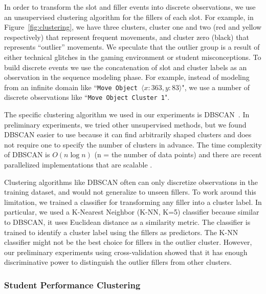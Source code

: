 \documentclass{sigchi}
\begin{document}
	In order to transform the slot and filler events into discrete observations, we use an unsupervised clustering algorithm for the fillers of each slot.
	For example, in Figure~\ref{fig:clustering}, we have three clusters, cluster one and two (red and yellow respectively) that represent frequent movements, and cluster zero (black) that represents ``outlier'' movements.
	We speculate that the outlier group is a result of either technical glitches in the gaming environment or student misconceptions.
	To build discrete events we use the concatenation of slot and cluster labels as an observation in the sequence modeling phase.
	For example, instead of modeling from an infinite  domain like ``\texttt{Move Object $\langle x:363, y:83 \rangle$}",
	we use a number of discrete observations like ``\texttt{Move Object Cluster 1}".
	
	The specific clustering algorithm we used in our experiments is DBSCAN~\cite{ester1996density}.
	In  preliminary experiments, we tried other unsupervised methods, but  we found DBSCAN easier to use because it can find arbitrarily shaped clusters and does not require one to specify the number of clusters in advance.
	The time complexity of DBSCAN is $O(n \log n)$ (n = the number of data points) and there are recent parallelized implementations that are scalable \cite{dai2012efficient, patwary2012new}.
	
	Clustering algorithms like DBSCAN often can only discretize observations in the training dataset, and would not generalize to unseen fillers.
	To work around this limitation, we trained a classifier for transforming any filler into a cluster label. 
	In particular, we used a K-Nearest Neighbor (K-NN, K=5) classifier because similar to DBSCAN, it uses Euclidean distance as a similarity metric.
	The classifier is trained to identify a cluster label using the fillers as predictors.
	The K-NN classifier might not be the best choice for fillers in the outlier cluster. 
	However, our preliminary experiments using cross-validation showed that it has enough discriminative power to distinguish the outlier fillers from other clusters.
	
	\subsubsection{Student Performance Clustering}
	\label{sec:student_disc}
\end{document}

